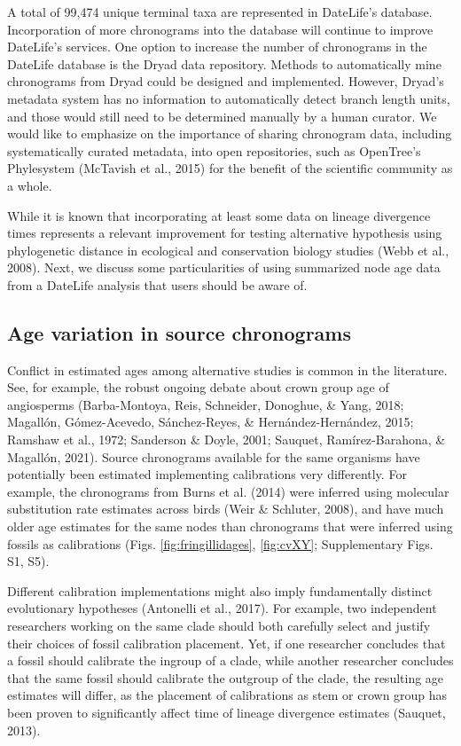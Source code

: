 \documentclass[english,man]{apa6}
\begin{document}
A total of 99,474 unique terminal taxa are represented in DateLife's database.
Incorporation of more chronograms into the database will continue to improve DateLife's services. One option to increase the number of chronograms in the DateLife database is the Dryad data repository. Methods to automatically mine chronograms from Dryad could be designed and implemented. However, Dryad's metadata system has no information to automatically detect branch length units, and those would still need to be determined manually by a human curator.
We would like to emphasize on the importance of sharing chronogram data, including systematically curated metadata, into open repositories, such as OpenTree's Phylesystem (McTavish et al., 2015) for the benefit of the scientific community as a whole.

While it is known that incorporating at least some data on lineage divergence times represents a relevant improvement for testing alternative hypothesis using phylogenetic distance in ecological and conservation biology studies (Webb et al., 2008). Next, we discuss some particularities of using summarized node age data from a DateLife analysis that users should be aware of.

\hypertarget{age-variation-in-source-chronograms}{%
\subsection{Age variation in source chronograms}\label{age-variation-in-source-chronograms}}

Conflict in estimated ages among alternative studies is common in the literature. See, for example, the robust ongoing debate about crown group age of angiosperms (Barba-Montoya, Reis, Schneider, Donoghue, \& Yang, 2018; Magallón, Gómez-Acevedo, Sánchez-Reyes, \& Hernández-Hernández, 2015; Ramshaw et al., 1972; Sanderson \& Doyle, 2001; Sauquet, Ramírez-Barahona, \& Magallón, 2021).
Source chronograms available for the same organisms have potentially been estimated implementing calibrations very differently.
For example, the chronograms from Burns et al. (2014) were inferred using molecular substitution rate estimates across birds (Weir \& Schluter, 2008), and have much older age estimates for the same nodes than chronograms that were inferred using fossils as calibrations (Figs. \ref{fig:fringillidages}, \ref{fig:cvXY}; Supplementary Figs. S1, S5).

Different calibration implementations might also imply fundamentally distinct evolutionary hypotheses (Antonelli et al., 2017).
For example, two independent researchers working on the same clade should both carefully select and justify their choices of fossil calibration placement.
Yet, if one researcher concludes that a fossil should calibrate the ingroup of a clade, while another researcher concludes that the same fossil should calibrate the outgroup of the clade, the resulting age estimates will differ, as the placement of calibrations as stem or crown group has been proven to significantly affect time of lineage divergence estimates (Sauquet, 2013).
\end{document}
